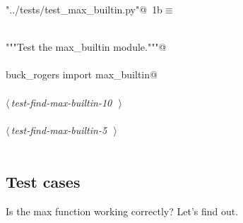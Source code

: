 \documentclass[a4paper,11pt]{article}
\begin{document}
\begin{flushleft} \small
\begin{minipage}{\linewidth}\label{scrap2}\raggedright\small
{} \verb@"../tests/test_max_builtin.py"@\nobreak\ {\footnotesize {1b}}$\equiv$
\vspace{-1ex}
\begin{list}{}{} \item
\mbox{}\lstinline@@\\
\mbox{}\lstinline@"""Test the max_builtin module."""@\\
\mbox{}\lstinline@@\\
\mbox{}\lstinline@from buck_rogers import max_builtin@\\
\mbox{}\lstinline@@\\
\mbox{}\lstinline@@\hbox{$\langle\,${\itshape test-find-max-builtin-10}\nobreak\ {\footnotesize {}}$\,\rangle$}\lstinline@@\\
\mbox{}\lstinline@@\\
\mbox{}\lstinline@@\hbox{$\langle\,${\itshape test-find-max-builtin-5}\nobreak\ {\footnotesize {}}$\,\rangle$}\lstinline@@\\
\mbox{}\lstinline@@\\
\mbox{}\lstinline@@{\NWsep}
\end{list}
\vspace{-1.5ex}
\footnotesize
\begin{list}{}{\setlength{\itemsep}{-\parsep}\setlength{\itemindent}{-\leftmargin}}

\item{}
\end{list}
\end{minipage}\vspace{4ex}
\end{flushleft}
\subsection{Test cases}

Is the max function working correctly? Let's find out.
\end{document}
